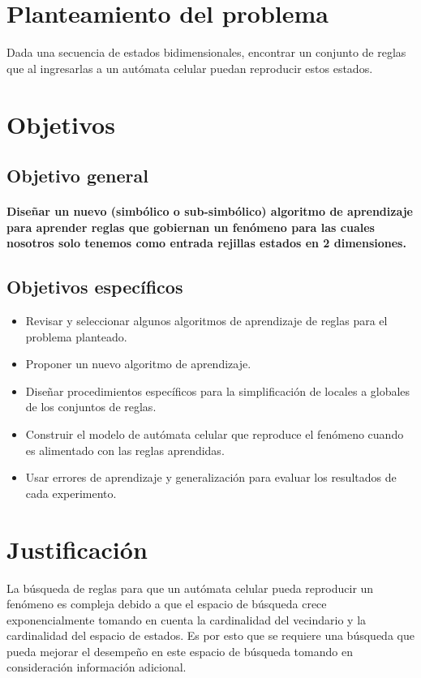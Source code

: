 \section{Planteamiento del problema}

Dada una secuencia de estados bidimensionales, encontrar un conjunto de reglas que al ingresarlas a un autómata celular puedan reproducir estos estados.

\section{Objetivos}
%
\subsection{Objetivo general}
\noindent \paragraph{Diseñar un nuevo (simbólico o sub-simbólico) algoritmo de aprendizaje para aprender reglas que gobiernan un fenómeno para las cuales nosotros solo tenemos como entrada rejillas estados en 2 dimensiones.}

\subsection{Objetivos específicos}
\begin{itemize}
\item Revisar y seleccionar algunos algoritmos de aprendizaje de reglas para el problema planteado.
\item Proponer un nuevo algoritmo de aprendizaje.
\item Diseñar procedimientos específicos para la simplificación de locales a globales de los conjuntos de reglas.
\item Construir el modelo de autómata celular que reproduce el fenómeno cuando es alimentado con las reglas aprendidas.
\item Usar errores de aprendizaje y generalización para evaluar los resultados de cada experimento. 
\end{itemize}

\section{Justificación}
La búsqueda de reglas para que un autómata celular pueda reproducir un fenómeno es compleja debido a que el espacio de búsqueda crece exponencialmente tomando en cuenta la cardinalidad del vecindario y la cardinalidad del espacio de estados. Es por esto que se requiere una búsqueda que pueda mejorar el desempeño en este espacio de búsqueda tomando en consideración información adicional.

